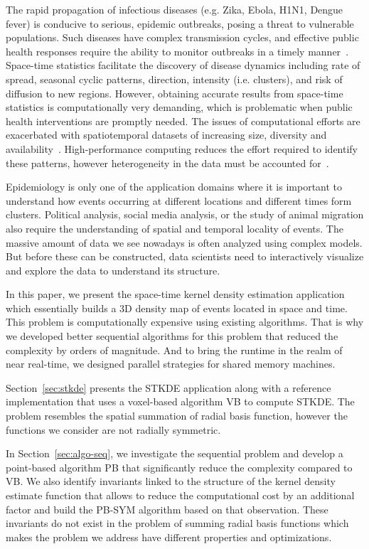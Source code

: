 \documentclass{article}
\begin{document}
The rapid propagation of infectious diseases (e.g. Zika, Ebola, H1N1,
Dengue fever) is conducive to serious, epidemic outbreaks, posing a
threat to vulnerable populations. Such diseases have complex
transmission cycles, and effective public health responses require the
ability to monitor outbreaks in a timely
manner~\cite{eisen2011using}. Space-time statistics facilitate the
discovery of disease dynamics including rate of spread, seasonal
cyclic patterns, direction, intensity (i.e. clusters), and risk of
diffusion to new regions.  However, obtaining accurate results from
space-time statistics is computationally very demanding, which is
problematic when public health interventions are promptly needed. The
issues of computational efforts are exacerbated with spatiotemporal
datasets of increasing size, diversity and
availability~\cite{grubesic2014spatial}. High-performance computing
reduces the effort required to identify these patterns, however
heterogeneity in the data must be accounted for~\cite{Hohl16}. 


Epidemiology is only one of the application domains where it is
important to understand how events occurring at different locations and
different times form clusters. Political analysis, social media
analysis, or the study of animal migration also require the
understanding of spatial and temporal locality of events. The massive
amount of data we see nowadays is often analyzed using complex
models. But before these can be constructed, data scientists  need to
interactively visualize and explore the data to understand its
structure. 

%
In this paper, we present the space-time kernel density estimation
application which essentially builds a 3D density map of events
located in space and time. This problem is computationally expensive
using existing algorithms. That is why we developed better sequential
algorithms for this problem that reduced the complexity by orders of
magnitude. And to bring the runtime in the realm of near real-time, we
designed parallel strategies for shared memory machines.

Section~\ref{sec:stkde} presents the STKDE application along with a
reference implementation that uses a voxel-based algorithm VB to
compute STKDE. The problem resembles the spatial summation of radial
basis function, however the functions we consider are not radially symmetric.

In Section~\ref{sec:algo-seq}, we investigate the sequential problem
and develop a point-based algorithm PB that significantly reduce the
complexity compared to VB. We also identify invariants linked to the
structure of the kernel density estimate function that allows to
reduce the computational cost by an additional factor and build the
PB-SYM algorithm based on that observation. These invariants do not
exist in the problem of summing radial basis functions which makes the
problem we address have different properties and optimizations.
\end{document}
